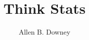 \documentclass[12pt]{book}
\title{Think Stats}
\author{Allen B. Downey}
\newif\ifplastex
\begin{document}
\frontmatter

\newcommand{\Erdos}{Erd\H{o}s}
\newcommand{\nhat}{\hat{N}}
\newcommand{\eps}{\varepsilon}
\newcommand{\slope}{\mathrm{slope}}
\newcommand{\inter}{\mathrm{inter}}
\newcommand{\xs}{\mathrm{xs}}
\newcommand{\ys}{\mathrm{ys}}
\newcommand{\res}{\mathrm{res}}
\newcommand{\xbar}{\bar{x}}
\newcommand{\ybar}{\bar{y}}
\newcommand{\PMF}{\mathrm{PMF}}
\newcommand{\PDF}{\mathrm{PDF}}
\newcommand{\CDF}{\mathrm{CDF}}
\newcommand{\ICDF}{\mathrm{ICDF}}
\newcommand{\Prob}{\mathrm{P}}
\newcommand{\Corr}{\mathrm{Corr}}
\newcommand{\normal}{\mathcal{N}}
\newcommand{\given}{|}
\newcommand{\goodchi}{\chi}

\ifplastex
    \usepackage{localdef}
    \maketitle

\newcount\anchorcnt
\newcommand*{\Anchor}[1]{%
  \@bsphack%
    \Hy@GlobalStepCount\anchorcnt%
    \edef\@currentHref{anchor.\the\anchorcnt}%
    \Hy@raisedlink{\hyper@anchorstart{\@currentHref}\hyper@anchorend}%
    \M@gettitle{}\label{#1}%
    \@esphack%
}


\else


  {\topsep}%
  {\topsep}%
  {}%
  {}%
  {\bfseries}%
  {}%
  { }%
  {}%

\theoremstyle{exercise}
\newtheorem{exercise}{Exercise}[chapter]




\end{document}
